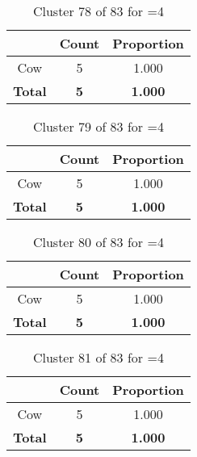 \begin{table}[ht!]
\centering
\begin{tabular}{|c|c|c|}
\hline
\bf \Spec{} &\bf Count &\bf Proportion\\ \hline \hline
Cow & 5 & 1.000\\ \hline
\hline
\bf Total & \bf 5 & \bf 1.000\\ \hline
\end{tabular}
\label{tab:cluster:78:4}
\caption{Cluster 78 of 83 for \minneigh{}=4}
\end{table}

\begin{table}[ht!]
\centering
\begin{tabular}{|c|c|c|}
\hline
\bf \Spec{} &\bf Count &\bf Proportion\\ \hline \hline
Cow & 5 & 1.000\\ \hline
\hline
\bf Total & \bf 5 & \bf 1.000\\ \hline
\end{tabular}
\label{tab:cluster:79:4}
\caption{Cluster 79 of 83 for \minneigh{}=4}
\end{table}

\clearpage
\begin{table}[ht!]
\centering
\begin{tabular}{|c|c|c|}
\hline
\bf \Spec{} &\bf Count &\bf Proportion\\ \hline \hline
Cow & 5 & 1.000\\ \hline
\hline
\bf Total & \bf 5 & \bf 1.000\\ \hline
\end{tabular}
\label{tab:cluster:80:4}
\caption{Cluster 80 of 83 for \minneigh{}=4}
\end{table}

\begin{table}[ht!]
\centering
\begin{tabular}{|c|c|c|}
\hline
\bf \Spec{} &\bf Count &\bf Proportion\\ \hline \hline
Cow & 5 & 1.000\\ \hline
\hline
\bf Total & \bf 5 & \bf 1.000\\ \hline
\end{tabular}
\label{tab:cluster:81:4}
\caption{Cluster 81 of 83 for \minneigh{}=4}
\end{table}


